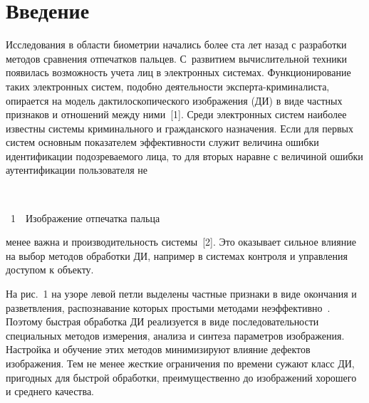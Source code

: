       \begin{multicols}{2}
      
            \label{st\stat}

\section{Введение}
  
  Исследования в области биометрии начались более ста лет назад с 
разработки методов сравнения отпечатков пальцев. С~развитием 
вы\-чис\-ли\-тель\-ной техники появилась возможность учета лиц в электронных 
системах. Функционирование таких электронных систем, подобно 
деятельности экс\-пер\-та-кри\-ми\-на\-лис\-та, опирается на модель 
дактилоскопического изображения (ДИ) в виде частных признаков и 
отношений между ними~[1]. Среди электронных систем наиболее известны 
системы криминального и гражданского назначения. Если для первых сис\-тем 
основным показателем эффективности служит величина ошибки 
идентификации  подозреваемого лица, то для вторых наравне с величиной 
ошибки аутентификации пользователя не\linebreak\vspace*{-12pt}
\begin{center} %
\vspace*{12pt}
\mbox{%
  \epsfxsize=75.856mm
}
\end{center}
\begin{center}
\vspace*{3pt}
{{\figurename~1}\ \ \small{Изображение отпечатка пальца}}
\end{center}

\addtocounter{figure}{1}


\noindent
 менее важна и производительность 
сис\-те\-мы~[2]. Это оказывает сильное влияние на выбор методов обработки 
ДИ, например в системах контроля и управления доступом к объекту.
  
  На рис.~1 на узоре левой петли выделены частные признаки в виде 
окончания и разветвления, распознавание которых простыми методами 
неэффективно~\cite{1-g, 3-g}. Поэтому быстрая обработка ДИ реализуется в 
виде последовательности специальных методов измерения, анализа и синтеза 
параметров изображения. Настройка и обучение этих методов минимизируют 
влияние дефектов изображения. Тем не менее жесткие ограничения по времени 
сужают класс ДИ, пригодных для быстрой обработки, преимущественно до 
изображений хорошего и среднего качества.



\end{multicols}
